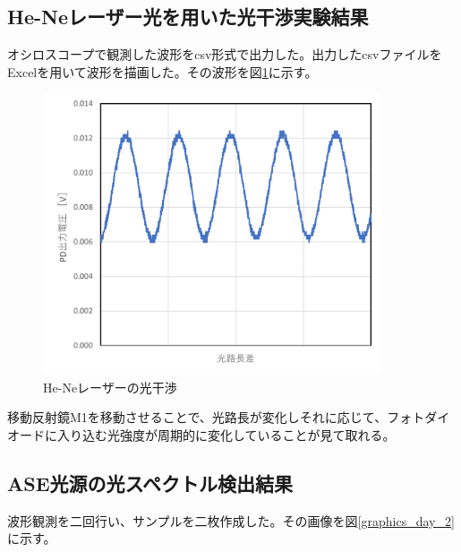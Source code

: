 \documentclass[uplatex, titlepage, fontsize=10pt, paper=a4paper]{jsarticle}
\numberwithin{equation}{section}
\begin{document}
\subsection{He-Neレーザー光を用いた光干渉実験結果}
オシロスコープで観測した波形をcsv形式で出力した。出力したcsvファイルをExcelを用いて波形を描画した。その波形を図\ref{graphic_day_1}に示す。

\begin{figure}[h]
    \centering
    \includegraphics[width = 10cm]{画像フォルダ/wave_day_1.png}
    \caption{He-Neレーザーの光干渉}
    \label{graphic_day_1}
\end{figure}

移動反射鏡M1を移動させることで、光路長が変化しそれに応じて、フォトダイオードに入り込む光強度が周期的に変化していることが見て取れる。

\subsection{ASE光源の光スペクトル検出結果}
波形観測を二回行い、サンプルを二枚作成した。その画像を図\ref{graphics_day_2}に示す。
\end{document}
